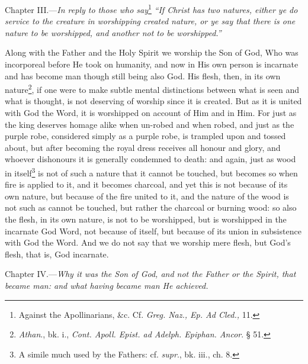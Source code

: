 
Chapter III.—\emph{In reply to those who say}\footnote{Against the Apollinarians, \&c. Cf. \emph{Greg. Naz., Ep. Ad Cled.,} 11.} \emph{“If Christ has two natures, either ye do service to the creature in worshipping created nature, or ye say that there is one nature to be worshipped, and another not to be worshipped.”}

Along with the Father and the Holy Spirit we worship the Son of God, Who was incorporeal before He took on humanity, and now in His own person is incarnate and has become man though still being also God. His flesh, then, in its own nature\footnote{\emph{Athan}., bk. i., \emph{Cont. Apoll. Epist. ad Adelph. Epiphan. Ancor}. § 51.}, if one were to make subtle mental distinctions between what is seen and what is thought, is not deserving of worship since it is created. But as it is united with God the Word, it is worshipped on account of Him and in Him. For just as the king deserves homage alike when un-robed and when robed, and just as the purple robe, considered simply as a purple robe, is trampled upon and tossed about, but after becoming the royal dress receives all honour and glory, and whoever dishonours it is generally condemned to death: and again, just as wood in itself\footnote{A simile much used by the Fathers: cf. \emph{supr}., bk. iii., ch. 8.} is not of such a nature that it cannot be touched, but becomes so when fire is applied to it, and it becomes charcoal, and yet this is not because of its own nature, but because of the fire united to it, and the nature of the wood is not such as cannot be touched, but rather the charcoal or burning wood: so also the flesh, in its own nature, is not to be worshipped, but is worshipped in the incarnate God Word, not because of itself, but because of its union in subsistence with God the Word. And we do not say that we worship mere flesh, but God’s flesh, that is, God incarnate.


Chapter IV.—\emph{Why it was the Son of God, and not the Father or the Spirit, that became man: and what having became man He achieved.}

